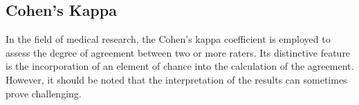 \documentclass[
a4paper, 
12pt,
grayscalebody, %
abstract=on,
twoside, BCOR10mm, 12pt, DIV13,headinclude, footexclude, final, abstracton, openright
]{ibireprt}
\numberwithin{equation}{chapter}
\numberwithin{table}{chapter}
\numberwithin{figure}{chapter}
\numberwithin{algorithm}{chapter}
\numberwithin{example}{chapter}
\numberwithin{example}{chapter}
\begin{document}


\subsection{Cohen's Kappa}
In the field of medical research, the Cohen's kappa coefficient is employed to assess the degree of agreement between two or more raters. Its distinctive feature is the incorporation of an element of chance into the calculation of the agreement. However, it should be noted that the interpretation of the results can sometimes prove challenging. 
\end{document}

